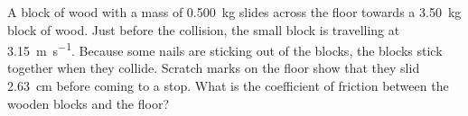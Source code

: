 \begin{example}
  A block of wood with a mass of \SI{.500}{\kilo\gram} slides across the floor
  towards a \SI{3.50}{\kilo\gram} block of wood. Just before the collision, the
  small block is travelling at \SI{3.15}{\metre\per\second}. Because some nails
  are sticking out of the blocks, the blocks stick together when they collide.
  Scratch marks on the floor show that they slid \SI{2.63}{\centi\metre} before
  coming to a stop. What is the coefficient of friction between the wooden
  blocks and the floor?
\end{example}
%

